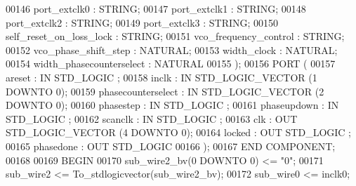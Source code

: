 \begin{DoxyCode}
{00146         port\_extclk0        : \textcolor{comment}{STRING};
00147         port\_extclk1        : \textcolor{comment}{STRING};
00148         port\_extclk2        : \textcolor{comment}{STRING};
00149         port\_extclk3        : \textcolor{comment}{STRING};
00150         self\_reset\_on\_loss\_lock     : \textcolor{comment}{STRING};
00151         vco\_frequency\_control       : \textcolor{comment}{STRING};
00152         vco\_phase\_shift\_step        : \textcolor{comment}{NATURAL};
00153         width\_clock     : \textcolor{comment}{NATURAL};
00154         width\_phasecounterselect        : \textcolor{comment}{NATURAL}
00155     );
00156     \textcolor{keywordflow}{PORT} (
00157             areset  : \textcolor{keywordflow}{IN} \textcolor{comment}{STD\_LOGIC} ;
00158             inclk   : \textcolor{keywordflow}{IN} \textcolor{comment}{STD\_LOGIC\_VECTOR} (\textcolor{vhdllogic}{}\textcolor{vhdllogic}{1} \textcolor{keywordflow}{DOWNTO} \textcolor{vhdllogic}{}\textcolor{vhdllogic}{0});
00159             phasecounterselect  : \textcolor{keywordflow}{IN} \textcolor{comment}{STD\_LOGIC\_VECTOR} (\textcolor{vhdllogic}{}\textcolor{vhdllogic}{2} \textcolor{keywordflow}{DOWNTO} \textcolor{vhdllogic}{}\textcolor{vhdllogic}{0});
00160             phasestep   : \textcolor{keywordflow}{IN} \textcolor{comment}{STD\_LOGIC} ;
00161             phaseupdown : \textcolor{keywordflow}{IN} \textcolor{comment}{STD\_LOGIC} ;
00162             scanclk : \textcolor{keywordflow}{IN} \textcolor{comment}{STD\_LOGIC} ;
00163             clk : \textcolor{keywordflow}{OUT} \textcolor{comment}{STD\_LOGIC\_VECTOR} (\textcolor{vhdllogic}{}\textcolor{vhdllogic}{4} \textcolor{keywordflow}{DOWNTO} \textcolor{vhdllogic}{}\textcolor{vhdllogic}{0});
00164             locked  : \textcolor{keywordflow}{OUT} \textcolor{comment}{STD\_LOGIC} ;
00165             phasedone   : \textcolor{keywordflow}{OUT} \textcolor{comment}{STD\_LOGIC} 
00166     );
00167     \textcolor{keywordflow}{END} \textcolor{keywordflow}{COMPONENT};
00168 
00169 \textcolor{vhdlkeyword}{BEGIN}
00170     \textcolor{vhdlchar}{sub_wire2_bv}\textcolor{vhdlchar}{(}\textcolor{vhdllogic}{}\textcolor{vhdllogic}{0} \textcolor{keywordflow}{DOWNTO} \textcolor{vhdllogic}{}\textcolor{vhdllogic}{0}\textcolor{vhdlchar}{)} \textcolor{vhdlchar}{<=} \textcolor{vhdllogic}{"0"};
00171     \textcolor{vhdlchar}{sub_wire2}    \textcolor{vhdlchar}{<=} \textcolor{vhdlchar}{To\_stdlogicvector}\textcolor{vhdlchar}{(}\textcolor{vhdlchar}{sub_wire2_bv}\textcolor{vhdlchar}{)};
00172     \textcolor{vhdlchar}{sub_wire0}    \textcolor{vhdlchar}{<=} \textcolor{vhdlchar}{inclk0};
}
\end{DoxyCode}

